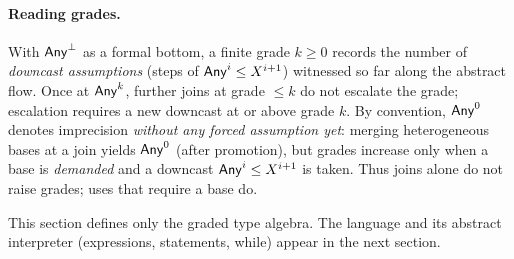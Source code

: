 \paragraph{Reading grades.}
With $\mathsf{Any}^{\bot}$ as a formal bottom, a finite grade $k\ge 0$ records the number of \emph{downcast assumptions} (steps of $\mathsf{Any}^{i}\le X^{i+1}$) witnessed so far along the abstract flow.
Once at $\mathsf{Any}^{k}$, further joins at grade $\le k$ do not escalate the grade; escalation requires a new downcast at or above grade $k$.
By convention, $\mathsf{Any}^{0}$ denotes imprecision \emph{without any forced assumption yet}:
merging heterogeneous bases at a join yields $\mathsf{Any}^{0}$ (after promotion), but grades increase only when a base is \emph{demanded} and a downcast $\mathsf{Any}^{i}\le X^{i+1}$ is taken.
Thus joins alone do not raise grades; uses that require a base do.

\medskip
This section defines only the graded type algebra.
The language and its abstract interpreter (expressions, statements, \textsf{while}) appear in the next section.
